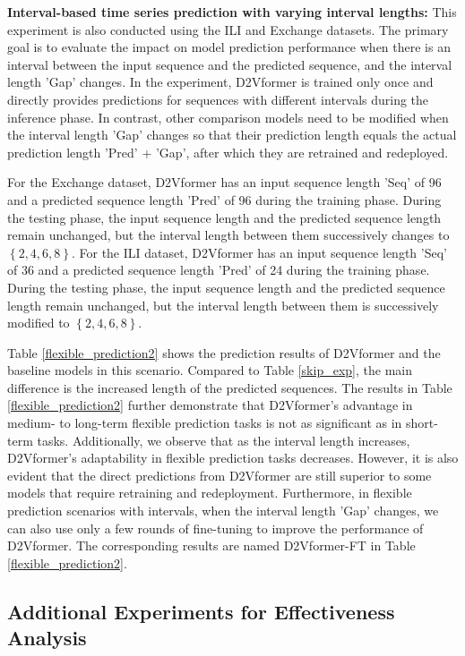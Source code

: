 \documentclass{article}
\begin{document}
\textbf{Interval-based time series prediction with varying interval lengths:} This experiment is also conducted using the ILI and Exchange datasets. The primary goal is to evaluate the impact on model prediction performance when there is an interval between the input sequence and the predicted sequence, and the interval length 'Gap' changes.
In the experiment, D2Vformer is trained only once and directly provides predictions for sequences with different intervals during the inference phase. In contrast, other comparison models need to be modified when the interval length 'Gap' changes so that their prediction length equals the actual prediction length 'Pred' + 'Gap', after which they are retrained and redeployed.

For the Exchange dataset, D2Vformer has an input sequence length 'Seq' of 96 and a predicted sequence length 'Pred' of 96 during the training phase. During the testing phase, the input sequence length and the predicted sequence length remain unchanged, but the interval length between them successively changes to $\left\{2, 4, 6, 8\right\}$. For the ILI dataset, D2Vformer has an input sequence length 'Seq' of 36 and a predicted sequence length 'Pred' of 24 during the training phase. During the testing phase, the input sequence length and the predicted sequence length remain unchanged, but the interval length between them is successively modified to $\left\{2, 4, 6, 8\right\}$.

Table \ref{flexible_prediction2} shows the prediction results of D2Vformer and the baseline models in this scenario. Compared to Table \ref{skip_exp}, the main difference is the increased length of the predicted sequences. The results in Table \ref{flexible_prediction2} further demonstrate that D2Vformer’s advantage in medium- to long-term flexible prediction tasks is not as significant as in short-term tasks. Additionally, we observe that as the interval length increases, D2Vformer’s adaptability in flexible prediction tasks decreases. However, it is also evident that the direct predictions from D2Vformer are still superior to some models that require retraining and redeployment.
Furthermore, in flexible prediction scenarios with intervals, when the interval length 'Gap' changes, we can also use only a few rounds of fine-tuning to improve the performance of D2Vformer. The corresponding results are named D2Vformer-FT in Table \ref{flexible_prediction2}.



\subsection{Additional Experiments for Effectiveness Analysis}\label{Effectiveness1}
\end{document}
